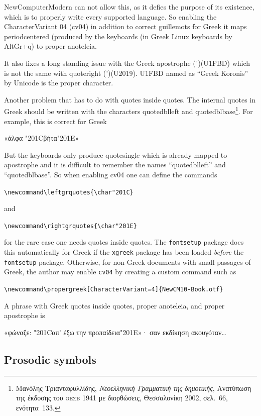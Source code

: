 \documentclass{article}
\newcommand\leftgrquotes{\char"201C} %
\newcommand\rightgrquotes{\char"201E} %
\begin{document}
NewComputerModern can not allow this, as it defies the purpose of its
existence, which is to properly write every supported language. So
enabling the CharacterVariant 04 (cv04) in addition to correct
guillemots for Greek it maps periodcentered (produced by the keyboards
(in Greek Linux keyboards by AltGr+q) to proper anoteleia.

It also fixes a long standing issue with the Greek apostrophe (᾽)(U1FBD) which
is not the same with quoteright (’)(U2019). U1FBD named as ``Greek Koronis''
by Unicode is the proper character.

Another problem that has to do with
quotes inside quotes. The internal quotes in Greek should be written with
the characters quotedblleft and quotedblbase\footnote{Μανόλης Τριανταφυλλίδης, \textit{Νεοελληνική Γραμματική της δημοτικής}, Ανατύπωση της έκδοσης του \textsc{οεσβ 1941} με διορθώσεις, Θεσσαλονίκη \textsc{2002}, σελ.~\textsc{66}, ενότητα~\textsc{133}.}. For example, this is correct for Greek
\begin{center}
 {\newcmgreekguillemots  «άλφα \leftgrquotes βήτα\rightgrquotes»}
\end{center}
But the keyboards only produce quotesingle which is already mapped to apostrophe
and it is difficult to remember the names ``quotedblleft'' and ``quotedblbase''. 
So when enabling cv04 one can define the commands

\verb|\newcommand\leftgrquotes{\char"201C}| %

\noindent and

\verb|\newcommand\rightgrquotes{\char"201E}| %

\noindent for the rare case one needs quotes inside quotes. The \verb|fontsetup| package
does this automatically for Greek if the \verb|xgreek| package has been loaded \textit{before}
the \verb|fontsetup| package. Otherwise, for non-Greek documents with small passages of Greek,
the author may enable \verb|cv04| by creating a custom command such as

\verb|\newcommand\propergreek[CharacterVariant=4]{NewCM10-Book.otf}|


A phrase with Greek quotes inside quotes, proper anoteleia, and proper apostrophe is

\begin{center}
{\newcmgreekguillemots  «φώναζε: \leftgrquotes απ' έξω την προπαίδεια\rightgrquotes»· σαν εκδίκηση ακουγόταν\ldots}
\end{center}

\subsection{Prosodic symbols}
\end{document}
